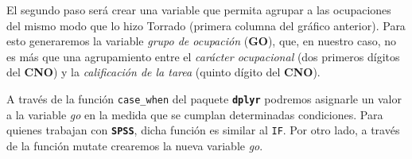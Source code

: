 \documentclass[
]{book}
\newenvironment{Shaded}{\begin{snugshade}}{\end{snugshade}}
\newcommand{\CommentTok}[1]{\textcolor[rgb]{0.56,0.35,0.01}{\textit{#1}}}
\newcommand{\DecValTok}[1]{\textcolor[rgb]{0.00,0.00,0.81}{#1}}
\newcommand{\FunctionTok}[1]{\textcolor[rgb]{0.00,0.00,0.00}{#1}}
\newcommand{\NormalTok}[1]{#1}
\newcommand{\OtherTok}[1]{\textcolor[rgb]{0.56,0.35,0.01}{#1}}
\newcommand{\SpecialCharTok}[1]{\textcolor[rgb]{0.00,0.00,0.00}{#1}}
\begin{document}
\begin{Shaded}
\end{Shaded}

El segundo paso será crear una variable que permita agrupar a las ocupaciones del mismo modo que lo hizo Torrado (primera columna del gráfico anterior). Para esto generaremos la variable \emph{grupo de ocupación} (\textbf{GO}), que, en nuestro caso, no es más que una agrupamiento entre el \emph{carácter ocupacional} (dos primeros dígitos del \textbf{CNO}) y la \emph{calificación de la tarea} (quinto dígito del \textbf{CNO}).

A través de la función \texttt{case\_when} del paquete \textbf{\texttt{dplyr}} podremos asignarle un valor a la variable \emph{go} en la medida que se cumplan determinadas condiciones. Para quienes trabajan con \textbf{\texttt{SPSS}}, dicha función es similar al \texttt{IF}. Por otro lado, a través de la función mutate crearemos la nueva variable \emph{go}.
\end{document}
